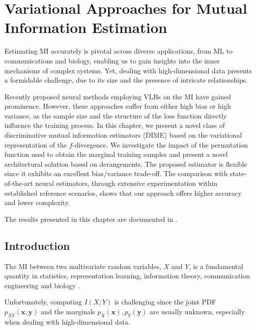\chapter{Variational Approaches for Mutual Information Estimation} %
\label{sec:mi_estimators}

Estimating MI accurately is pivotal across diverse applications, from ML to communications and biology, enabling us to gain insights into the inner mechanisms of complex systems. Yet, dealing with high-dimensional data presents a formidable challenge, due to its size and the presence of intricate relationships. 

Recently proposed neural methods employing VLBs on the MI have gained prominence. However, these approaches suffer from either high bias or high variance, as the sample size and the structure of the loss function directly influence the training process. In this chapter, we present a novel class of discriminative mutual information estimators (DIME) based on the variational representation of the $f$-divergence. We investigate the impact of the permutation function used to obtain the marginal training samples and present a novel architectural solution based on derangements. The proposed estimator is flexible since it exhibits an excellent bias/variance trade-off. The comparison with state-of-the-art neural estimators, through extensive experimentation within established reference scenarios, shows that our approach offers higher accuracy and lower complexity.

The results presented in this chapter are documented in \cite{LetiziaNIPS, f-DIME, letizia2022Balkan}.

\section{Introduction}
\label{sec:mi_related}
The MI between two multivariate random variables, $X$ and $Y$, is a fundamental quantity in statistics, representation learning, information theory, communication engineering and biology \cite{goldfeld2021sliced, tschannen2019mutual, guo2005mutual, pluim2003mutual}. 

Unfortunately, computing $I(X;Y)$ is challenging since the joint PDF $p_{XY}(\mathbf{x},\mathbf{y})$ and the marginals $p_X(\mathbf{x}),p_Y(\mathbf{y})$ are usually unknown, especially when dealing with high-dimensional data.

